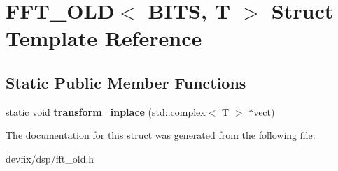 \hypertarget{structFFT__OLD}{}\section{F\+F\+T\+\_\+\+O\+LD$<$ B\+I\+TS, T $>$ Struct Template Reference}
\label{structFFT__OLD}
\subsection*{Static Public Member Functions}
\begin{DoxyCompactItemize}
\item 
\mbox{\label{structFFT__OLD_a8c613bb979e86614738cf23417cc089a}} 
static void {\bfseries transform\+\_\+inplace} (std\+::complex$<$ T $>$ $\ast$vect)
\end{DoxyCompactItemize}


The documentation for this struct was generated from the following file\+:\begin{DoxyCompactItemize}
\item 
devfix/dsp/fft\+\_\+old.\+h\end{DoxyCompactItemize}
